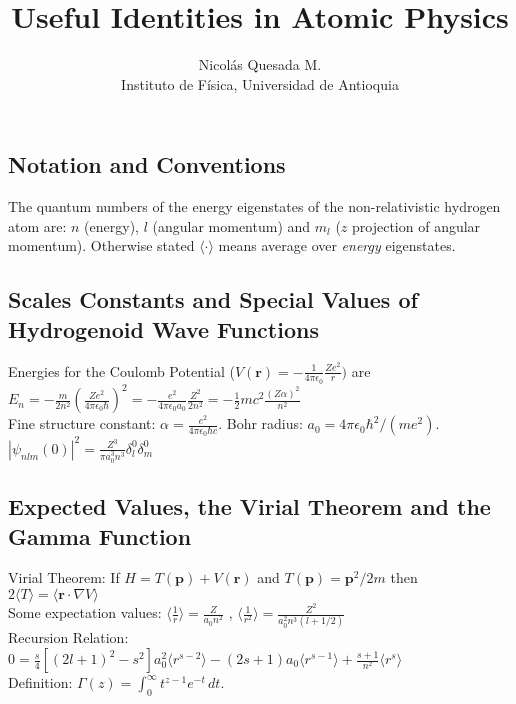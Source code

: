 \documentclass[10.5pt,letterpaper]{article}
\date{}
\title{Useful Identities in Atomic Physics}
\author{Nicol\'as Quesada M.\\{\small \sf Instituto de F\'isica, Universidad de Antioquia}}
\begin{document}
\maketitle
\thispagestyle{empty}
\subsection*{Notation and Conventions}
The quantum numbers of the energy eigenstates of the non-relativistic hydrogen atom are: $n$ (energy), $l$ (angular momentum) and $m_l$ ($z$ projection of angular momentum). Otherwise stated  $\langle \cdot \rangle$ means average over \emph{energy} eigenstates.

\subsection*{Scales Constants and Special Values of Hydrogenoid Wave Functions}

Energies for the Coulomb Potential ($V(\textbf{r})=-\frac{1}{4 \pi \epsilon_0}\frac{Z e^2}{r})$ are $E_n=-\frac{m}{2n^2}\left( \frac{Ze^2}{4 \pi \epsilon_0 \hbar} \right)^2=-\frac{e^2}{4 \pi \epsilon_0 a_0} \frac{Z^2}{2 n^2}=-\frac{1}{2} m c^2 \frac{(Z \alpha)^2}{n ^2}$\\

Fine structure constant: $\alpha=\frac{e^2}{4 \pi \epsilon_0 \hbar c}$. Bohr radius: $a_0=4 \pi \epsilon_0 \hbar^2/(m e^2)$. \space \space \space
$|\psi_{n l m}(0)|^2=\frac{Z^3}{\pi a_0^3 n^3} \delta_{l}^0 \delta_m^0$

\subsection*{Expected Values, the Virial Theorem and the Gamma Function}

Virial Theorem: If $H=T(\textbf{p})+V(\textbf{r})$ and $T(\textbf{p})=\textbf{p}^2/2m$ then $2\langle T \rangle=\langle \textbf{r} \cdot \nabla V \rangle$\\

Some expectation values: $\langle \frac{1}{r} \rangle=\frac{Z}{a_0 n^2}$ , $\langle \frac{1}{r^2} \rangle=\frac{Z^2}{a_0^2 n^3 (l+1/2)}$\\

Recursion Relation: $0=\frac{s}{4}\left[(2 l+1)^2-s^2 \right] a_0^2 \langle r^{s-2} \rangle-(2s+1)a_0 \langle r^{s-1} \rangle+\frac{s+1}{n^2} \langle r^s \rangle$\\

Definition: $\Gamma(z) = \int_0^\infty  t^{z-1} e^{-t}\,dt $.\\
\end{document}
